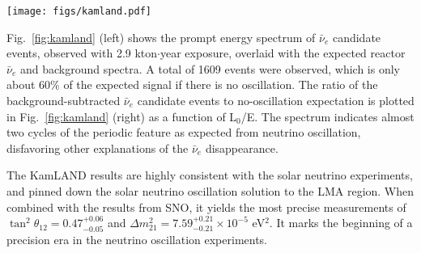 \begin{figure*}[htb] \label{fig:kamland}
  \centering
  \texttt{[image: figs/kamland.pdf]}
  \caption{KamLAND results: (left) Prompt energy spectrum of $\bar\nu_e$ candidate
  events. All histograms corresponding to reactor spectra and expected
  backgrounds incorporate the energy-dependent selection efficiency
  (top panel). The shaded background and geoneutrino histograms are
  cumulative. 
  (right) Ratio of the background-subtracted
  $\bar\nu_e$ spectrum to the expectation for no-oscillation as a
  function of $L_{0}/E$. $L_{0}$ is the effective baseline taken as a
  flux-weighted average ($L_{0}$\,=\,180\,km). The oscillation survival probability using the best estimates of $\theta_{12}$ and $|\Delta{m}^2_{21}|$ is given by the blue curve.}
\end{figure*}

Fig.~\ref{fig:kamland} (left) shows the prompt energy spectrum of $\bar\nu_e$ candidate
events, observed with 2.9 kton$\cdot$year exposure, overlaid with the expected reactor $\bar\nu_{e}$ and background spectra. A total of 1609 events were observed, which is only about 60\% of the expected signal if there is no oscillation. The ratio of the background-subtracted $\bar\nu_e$ candidate events to no-oscillation expectation is plotted in Fig.~\ref{fig:kamland} (right) as a function of L$_0$/E. The spectrum indicates almost two cycles of the periodic feature as expected from neutrino oscillation, disfavoring other explanations of the $\bar\nu_e$ disappearance.

The KamLAND results \cite{Kamland03,Kamland05,Kamland08} are highly consistent with the solar neutrino experiments, and pinned down the solar neutrino oscillation solution to the LMA region. When combined with the results from SNO, it yields the most precise measurements of $\tan^2\theta_{12} = 0.47^{+0.06}_{-0.05}$ and $\Delta m^2_{21} = 7.59^{+0.21}_{-0.21} \times 10^{-5}$ eV$^2$. It marks the beginning of a precision era in the neutrino oscillation experiments.

